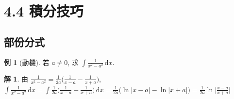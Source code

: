 \documentclass[12pt]{extarticle}
\newcommand{\ds}{\displaystyle}
\theoremstyle{definition}
\newtheorem*{ex}{例}
\newtheorem*{sol}{解}
\begin{document}
\section*{4.4 積分技巧}
\subsection*{部份分式}

\begin{ex}[動機]
  若 $a\ne 0$, 求 $\ds\int\!\!\frac{1}{x^2 - a^2}\,\text{d}x$. 
\end{ex}

\begin{sol}
  由 $\ds\frac{1}{x^2 - a^2} = \frac{1}{2a}\bigg(\frac{1}{x - a} - \frac{1}{x + a}\bigg)$, $\ds\int\!\!\frac{1}{x^2 - a^2}\,\text{d}x = \int\!\frac{1}{2a}\bigg(\frac{1}{x - a} - \frac{1}{x + a}\bigg)\,\text{d}x = \frac{1}{2a}\big(\ln|x - a| - \ln|x + a|\big) = \frac{1}{2a}\ln\Big|\frac{x - a}{x + a}\Big|$
\end{sol}
\end{document}
